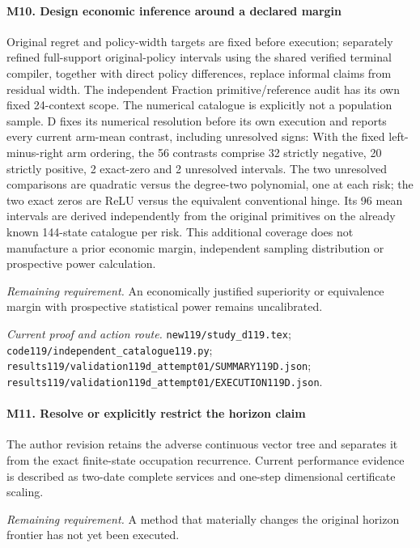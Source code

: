 \paragraph{M10. Design economic inference around a declared margin}

Original regret and policy-width targets are fixed before execution; separately refined full-support original-policy intervals using the shared verified terminal compiler, together with direct policy differences, replace informal claims from residual width. The independent Fraction primitive/\allowbreak{}reference audit has its own fixed 24-context scope. The numerical catalogue is explicitly not a population sample. D fixes its numerical resolution before its own execution and reports every current arm-mean contrast, including unresolved signs: With the fixed left-minus-right arm ordering, the 56 contrasts comprise 32 strictly negative, 20 strictly positive, 2 exact-zero and 2 unresolved intervals. The two unresolved comparisons are quadratic versus the degree-two polynomial, one at each risk; the two exact zeros are ReLU versus the equivalent conventional hinge. Its 96 mean intervals are derived independently from the original primitives on the already known 144-state catalogue per risk. This additional coverage does not manufacture a prior economic margin, independent sampling distribution or prospective power calculation.

\par\emph{Remaining requirement.} An economically justified superiority or equivalence margin with prospective statistical power remains uncalibrated.

\par\emph{Current proof and action route.} \nolinkurl{new119/study_d119.tex}; \nolinkurl{code119/independent_catalogue119.py}; \nolinkurl{results119/validation119d_attempt01/SUMMARY119D.json}; \nolinkurl{results119/validation119d_attempt01/EXECUTION119D.json}.

\paragraph{M11. Resolve or explicitly restrict the horizon claim}

The author revision retains the adverse continuous vector tree and separates it from the exact finite-state occupation recurrence. Current performance evidence is described as two-date complete services and one-step dimensional certificate scaling.

\par\emph{Remaining requirement.} A method that materially changes the original horizon frontier has not yet been executed.

